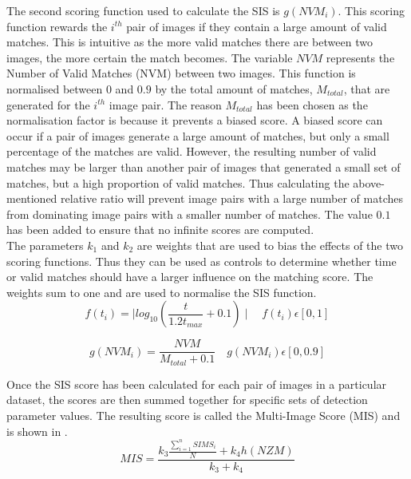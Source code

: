\documentclass{article}
\begin{document}
The second scoring function used to calculate the SIS is $g(NVM_{i})$. This scoring function rewards the $i^{th}$ pair of images if they contain a large amount of valid matches. This is intuitive as the more valid matches there are between two images, the more certain the match becomes. The variable $NVM$ represents the Number of Valid Matches (NVM) between two images. This function is normalised between $0$ and  $0.9$ by the total amount of matches, $M_{total}$, that are generated for the $i^{th}$ image pair. The reason $M_{total}$ has been chosen as the normalisation factor is because it prevents a biased score. A biased score can occur if a pair of images generate a large amount of matches, but only a small percentage of the matches are valid. However, the resulting number of valid matches may be larger than another pair of images that generated a small set of matches, but a high proportion of valid matches. Thus calculating the above-mentioned relative ratio will prevent image pairs with a large number of matches from dominating image pairs with a smaller number of matches. The value $0.1$ has been added to ensure that no infinite scores are computed.\\ 

The parameters $k_1$ and $k_2$ are weights that are used to bias the effects of the two scoring functions. Thus they can be used as controls to determine whether time or valid matches should have a larger influence on the matching score. The weights sum to one and are used to normalise the SIS function.\\

\begin{equation}
f(t_{i}) = \mid log_{10}(\frac{t}{1.2 t_{max}} + 0.1) \mid \quad f(t_{i})\epsilon [0, 1]
\label{eqn:time}
\end{equation}

\begin{equation}
g(NVM_{i}) = \frac{NVM}{M_{total} + 0.1} \quad g(NVM_{i}) \epsilon [0, 0.9]
\label{eqn:nvm}
\end{equation}

Once the SIS score has been calculated for each pair of images in a particular dataset, the scores are then summed together for specific sets of detection parameter values. The resulting score is called the Multi-Image Score (MIS) and is shown in .\\

\begin{equation}
MIS = \frac{k_3 \frac{\sum_{i=1}^{n} SIMS_{i}}{N} + k_4 h(NZM)}{k_3 + k_4}
\label{eqn:mims}
\end{equation}
\end{document}
